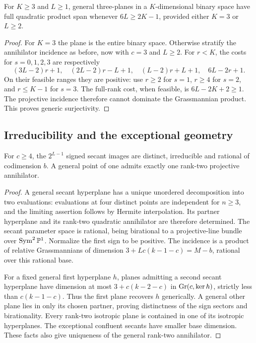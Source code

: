 \begin{lemma}\label{lem:three-plane-residual}
For $K\ge3$ and $L\ge1$, general three-planes in a $K$-dimensional
binary space have full quadratic product span whenever $6L\ge2K-1$,
provided either $K=3$ or $L\ge2$.
\end{lemma}
\begin{proof}
For $K=3$ the plane is the entire binary space. Otherwise stratify the
annihilator incidence as before, now with $c=3$ and $L\ge2$.
For $r<K$, the costs for $s=0,1,2,3$ are respectively
\[
 (3L-2)r+1,\quad(2L-2)r-L+1,\quad(L-2)r+L+1,
 \quad6L-2r+1.
\]
On their feasible ranges they are positive: use $r\ge2$ for $s=1$,
$r\ge4$ for $s=2$, and $r\le K-1$ for $s=3$.
The full-rank cost, when feasible, is $6L-2K+2\ge1$.
The projective incidence therefore cannot dominate the Grassmannian
product. This proves generic surjectivity.
\end{proof}

\subsection{Irreducibility and the exceptional geometry}
\begin{lemma}\label{lem:all-signed}
For $c\ge4$, the $2^{L-1}$ signed secant images are distinct,
irreducible and rational of codimension $b$. A general point of one
admits exactly one rank-two projective annihilator.
\end{lemma}
\begin{proof}
A general secant hyperplane has a unique unordered decomposition into
two evaluations: evaluations at four distinct points are independent
for $n\ge3$, and the limiting assertion follows by Hermite
interpolation. Its partner hyperplane and its rank-two quadratic
annihilator are therefore determined. The secant parameter space is
rational, being birational to a projective-line bundle over
$\operatorname{Sym}^2\mathbb P^1$. Normalize the first sign to be positive.
The incidence is a product of relative Grassmannians of dimension
$3+Lc(k-1-c)=M-b$, rational over this rational base.

For a fixed general first hyperplane $h$, planes admitting a second
secant hyperplane have dimension at most $3+c(k-2-c)$ in
$\operatorname{Gr}(c,\ker h)$, strictly less than $c(k-1-c)$. Thus the first plane
recovers $h$ generically. A general other plane lies in only its chosen
partner, proving distinctness of the sign sectors and birationality.
Every rank-two isotropic plane is contained in one of its isotropic
hyperplanes. The exceptional confluent secants have smaller base
dimension. These facts also give uniqueness of the general rank-two
annihilator.
\end{proof}


